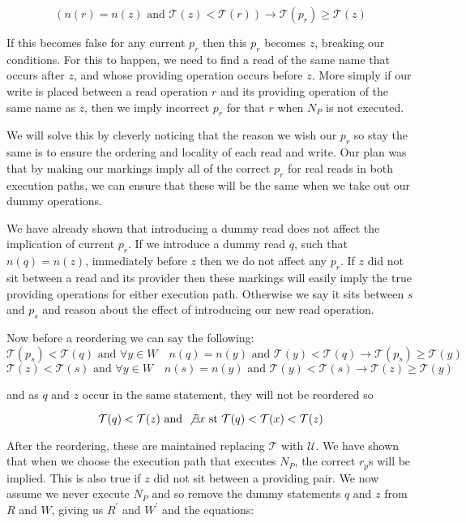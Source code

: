 \documentclass[twoside,a4paper]{report}
\begin{document}
$$(n(r) = n(z) \text{ and } \mathcal{T}(z) < \mathcal{T}(r)) \rightarrow \mathcal{T}(p_r) \ge \mathcal{T}(z)$$

If this becomes false for any current $p_r$ then this $p_r$ becomes $z$, breaking our conditions. For this to happen, we need to find a read of the same name
that occurs after $z$, and whose providing operation occurs before $z$. More simply if our write is placed between a read operation $r$ and its providing operation
of the same name as $z$, then we imply incorrect $p_r$ for that $r$ when $N_P$ is not executed.

We will solve this by cleverly noticing that the reason we wish our $p_r$ so stay the same is to ensure the ordering and locality of each read and write. Our
plan was that by making our markings imply all of the correct $p_r$ for real reads in both execution paths, we can ensure that these will be the same when we
take out our dummy operations.

We have already shown that introducing a dummy read does not affect the implication of current $p_r$. If we introduce a dummy read $q$, such that $n(q) = n(z)$,
immediately before $z$ then we do not affect any $p_r$. If $z$ did not sit between a read and its provider then these markings will easily imply the true
providing operations for either execution path. Otherwise we say it sits between $s$ and $p_s$ and reason about the effect of introducing our new read operation.

Now before a reordering we can say the following:
$$
\mathcal{T}(p_s) < \mathcal{T}(q) \text{ and }
\forall y \in W \quad n(q) = n(y) \text{ and } \mathcal{T}(y) < \mathcal{T}(q) \rightarrow \mathcal{T}(p_s) \ge \mathcal{T}(y)
$$
$$
\mathcal{T}(z) < \mathcal{T}(s) \text{ and }
\forall y \in W \quad n(s) = n(y) \text{ and } \mathcal{T}(y) < \mathcal{T}(s) \rightarrow \mathcal{T}(z) \ge \mathcal{T}(y)
$$

and as $q$ and $z$ occur in the same statement, they will not be reordered so

$$\mathcal{T}(q) < \mathcal{T}(z) \text{ and } \not \exists x \text{ st } \mathcal{T}(q) < \mathcal{T}(x) < \mathcal{T}(z)$$

After the reordering, these are maintained replacing $\mathcal{T}$ with $\mathcal{U}$. We have shown that when we choose the execution path that executes $N_P$,
the correct $r_p$s will be implied. This is also true if $z$ did not sit between a providing pair. We now assume we never execute $N_P$ and so remove the dummy
statements $q$ and $z$ from $R$ and $W$, giving us $R^\prime$ and $W^\prime$ and the equations:
\end{document}

